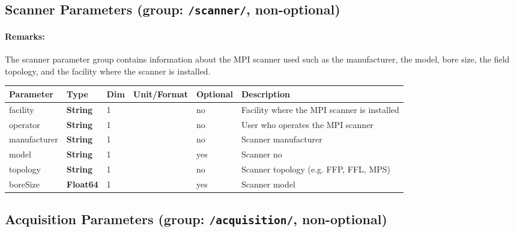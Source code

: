 \documentclass[landscape,a4paper]{article} %
\newcommand{\inl}[1]{\lstinline[columns=fixed]{#1}}
\newcommand{\inltab}[1]{{\ttfamily\bfseries\color{blue}#1}}
\newcommand{\inlvar}[1]{{\ttfamily#1}}
\begin{document}
\subsection{Scanner Parameters (group: \inl{/scanner/}, non-optional)}

\begin{multicols}{2}
\paragraph{Remarks:} The scanner parameter group contains information about the MPI scanner used such as the manufacturer, the model, bore size, the field topology, and the facility where the scanner is installed.
\end{multicols}

\noindent \begin{tabularx}{\columnwidth}{lllllX}
\noindent \textbf{Parameter} & \textbf{Type} & \textbf{Dim} & \textbf{Unit/Format} & \textbf{Optional} & \textbf{Description} \\ \hline 
\inlvar{facility} & \inltab{String} & 1 & & no & Facility where the MPI scanner is installed \\ \hline 
\inlvar{operator} & \inltab{String} & 1 & & no & User who operates the MPI scanner \\ \hline 
\inlvar{manufacturer} & \inltab{String} & 1 & & no & Scanner manufacturer \\ \hline 
\inlvar{model} & \inltab{String} & 1 & & yes & Scanner no \\ \hline 
\inlvar{topology} & \inltab{String} & 1 & & no & Scanner topology (e.g. FFP, FFL, MPS)\\ \hline 
\inlvar{boreSize} & \inltab{Float64} & 1 & & yes & Scanner model \\ \hline 
\end{tabularx}


\subsection{Acquisition Parameters (group: \inl{/acquisition/}, non-optional)}
\end{document}
